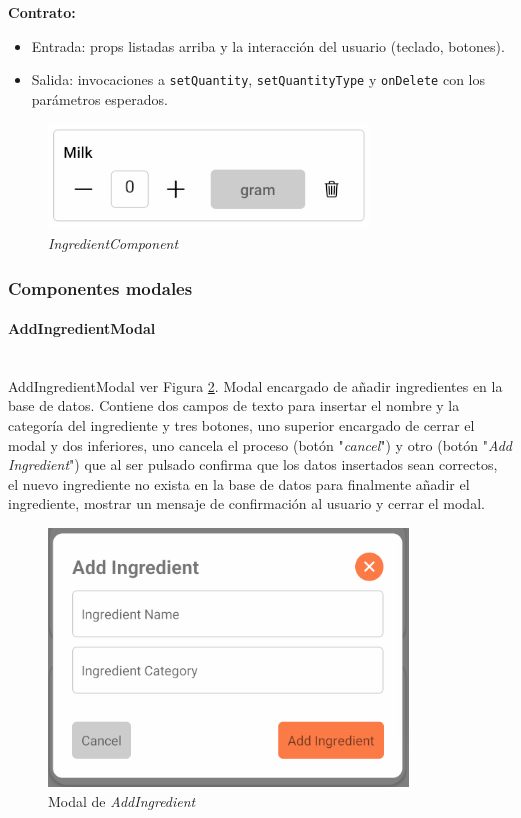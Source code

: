 \documentclass[twoside, openright, 11pt]{report}
\begin{document}
				\textbf{Contrato:}
				\begin{itemize}
					\item Entrada: props listadas arriba y la interacción del usuario (teclado, botones).
					\item Salida: invocaciones a \texttt{setQuantity}, \texttt{setQuantityType} y \texttt{onDelete} con los parámetros esperados.
				\end{itemize}
				
				\begin{figure}[H]
					\centering
					\includegraphics{imagenes/IngredientComponent}
					\caption{\textit{IngredientComponent}}
					\label{fig:IngredientComponent}
				\end{figure}
				
				
				
					
			\subsubsection{Componentes modales}
				\paragraph{AddIngredientModal\\\\}
					\label{AddIngredientModal} 
					AddIngredientModal ver Figura \ref{fig:AddIngredientModal}. Modal encargado de añadir ingredientes en la base de datos. Contiene dos campos de texto para insertar el nombre y la categoría del ingrediente y tres botones, uno superior encargado de cerrar el modal y dos inferiores, uno cancela el proceso (botón "\textit{cancel}") y otro (botón "\textit{Add Ingredient}") que al ser pulsado confirma que los datos insertados sean correctos, el nuevo ingrediente no exista en la base de datos para finalmente añadir el ingrediente, mostrar un mensaje de confirmación al usuario y cerrar el modal.
						
					\begin{figure}[H]
						\centering
						\includegraphics{imagenes/AddIngredientModal}
						\caption{Modal de \textit{AddIngredient}}
						\label{fig:AddIngredientModal}
					\end{figure}
\end{document}
